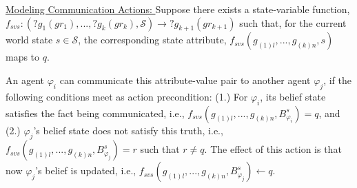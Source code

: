 \documentclass[letterpaper]{article} %
\begin{document}





\underline{Modeling Communication Actions: } 
Suppose there exists a state-variable function, $f_{svs}:(?g_1 (gr_1), ..., ?g_k (gr_k),\mathcal{S}) \rightarrow ?g_{k+1} (gr_{k+1})$ such that,
for the current world state $s \in \mathcal{S}$, the corresponding state attribute, $f_{\textit{svs}}(g_{(1)l},...,g_{(k)n},s)$ maps to $q$.

An agent $\varphi_i$ can communicate this attribute-value pair to another agent $\varphi_j$, if the following conditions meet as action precondition: 
(1.) For $\varphi_i$, its belief state satisfies the fact being communicated, i.e.,
$f_{\textit{svs}}(g_{(1)l},...,g_{(k)n},B_{\varphi_i}^s) = q$, and (2.) $\varphi_j$'s belief state does not satisfy this truth, i.e., $f_{\textit{svs}}(g_{(1)l},...,g_{(k)n},B_{\varphi_j}^s) = r$ such that $r \neq q$.
The effect of this action is that now 
$\varphi_j$'s belief is updated, i.e., $f_{\textit{svs}}(g_{(1)l},...,g_{(k)n},B_{\varphi_j}^s) \leftarrow q$. 
\end{document}
